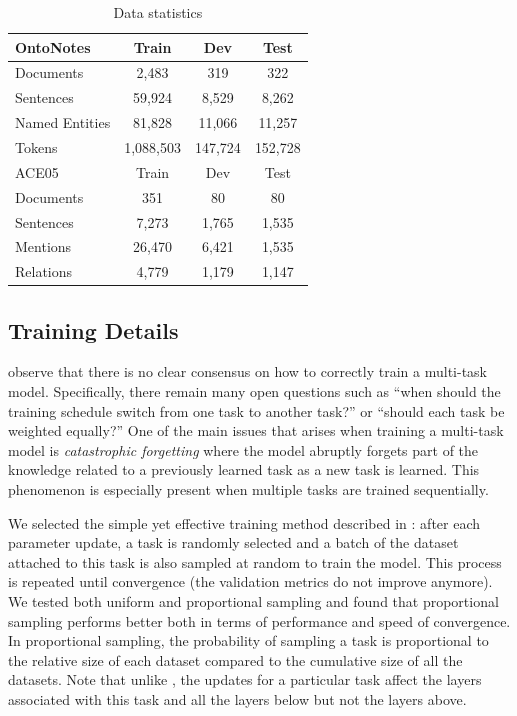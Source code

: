\documentclass[letterpaper]{article} %
\begin{document}
\begin{table}
  \caption{Data statistics}
  \label{ontonotes_statistics}
  \centering
  \begin{tabular}{lccc}
    \hline
    OntoNotes & Train & Dev & Test \\
    \hline
    Documents & 2,483 & 319 & 322 \\
    Sentences & 59,924 & 8,529 & 8,262 \\
    Named Entities & 81,828 & 11,066 & 11,257 \\
    Tokens & 1,088,503 & 147,724 & 152,728 \\
    \hline
    ACE05 & Train & Dev & Test \\
    \hline
    Documents & 351 & 80 & 80 \\
    Sentences & 7,273 & 1,765 & 1,535 \\
    Mentions & 26,470 & 6,421 & 1,535 \\
    Relations & 4,779 & 1,179 & 1,147 \\
    \hline
  \end{tabular}
\end{table}


\subsection{Training Details}
\label{subsec:training}

\citeauthor{Subramanian2018}  observe that there is no clear consensus on how to correctly train a multi-task model. Specifically, there remain many open questions such as ``when should the training schedule switch from one task to another task?'' or ``should each task be weighted equally?'' One of the main issues that arises when training a multi-task model is \textit{catastrophic forgetting} \cite{French1999} where the model abruptly forgets part of the knowledge related to a previously learned task as a new task is learned. This phenomenon is especially present when multiple tasks are trained sequentially.

We selected the simple yet effective training method described in \cite{Sogaard2016,Ruder2017c}: after each parameter update, a task is randomly selected and a batch of the dataset attached to this task is also sampled at random to train the model. This process is repeated until convergence (the validation metrics do not improve anymore). We tested both uniform and proportional sampling and found that proportional sampling performs better both in terms of performance and speed of convergence. In proportional sampling, the probability of sampling a task is proportional to the relative size of each dataset compared to the cumulative size of all the datasets. Note that unlike \cite{Subramanian2018}, the updates for a particular task affect the layers associated with this task and all the layers below but not the layers above.
\end{document}
